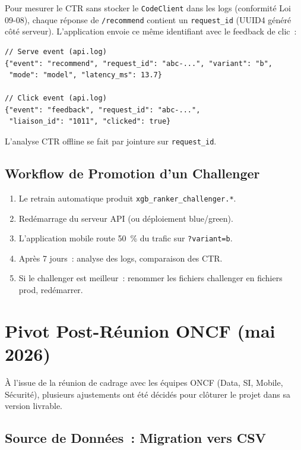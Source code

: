 \documentclass[12pt, a4paper]{report}
\begin{document}
Pour mesurer le CTR sans stocker le \texttt{CodeClient} dans les logs
(conformité Loi 09-08), chaque réponse de \texttt{/recommend} contient un
\texttt{request\_id} (UUID4 généré côté serveur). L'application envoie ce
même identifiant avec le feedback de clic~:

\begin{lstlisting}[style=json, caption={\'Ev\'enements serve et click corr\'el\'es via request\_id}]
// Serve event (api.log)
{"event": "recommend", "request_id": "abc-...", "variant": "b",
 "mode": "model", "latency_ms": 13.7}

// Click event (api.log)
{"event": "feedback", "request_id": "abc-...",
 "liaison_id": "1011", "clicked": true}
\end{lstlisting}

L'analyse CTR offline se fait par jointure sur \texttt{request\_id}.

\subsection{Workflow de Promotion d'un Challenger}

\begin{enumerate}
\item Le retrain automatique produit \texttt{xgb\_ranker\_challenger.*}.
\item Redémarrage du serveur API (ou déploiement blue/green).
\item L'application mobile route 50~\% du trafic sur \texttt{?variant=b}.
\item Après 7 jours~: analyse des logs, comparaison des CTR.
\item Si le challenger est meilleur~: renommer les fichiers challenger en
    fichiers prod, redémarrer.
\end{enumerate}

\newpage
\section{Pivot Post-Réunion ONCF (mai 2026)}
\label{sec:pivot-post-reunion}

À l'issue de la réunion de cadrage avec les équipes ONCF (Data, SI, Mobile,
Sécurité), plusieurs ajustements ont été décidés pour clôturer le projet
dans sa version livrable.

\subsection{Source de Données~: Migration vers CSV}
\end{document}
